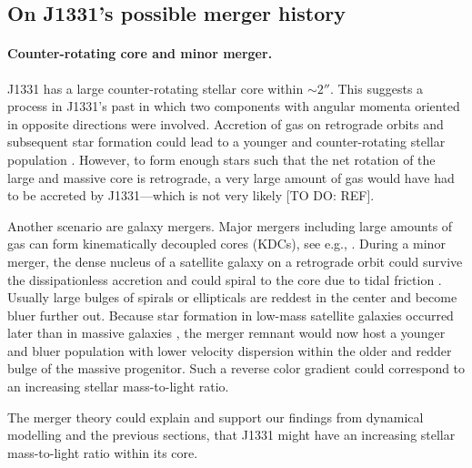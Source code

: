 \subsection{On J1331's possible merger history}


\paragraph{Counter-rotating core and minor merger.} J1331 has a large counter-rotating stellar core within $\sim 2''$. This suggests a process in J1331's past in which two components with angular momenta oriented in opposite directions were involved. Accretion of gas on retrograde orbits and subsequent star formation could lead to a younger and counter-rotating stellar population \Wilma{[TO DO: REF]}. However, to form enough stars such that the net rotation of the large and massive core is retrograde, a very large amount of gas would have had to be accreted by J1331---which is not very likely [TO DO: REF]. 

Another scenario are galaxy mergers. Major mergers including large amounts of gas can form kinematically decoupled cores (KDCs), see e.g., . During a minor merger, the dense nucleus of a satellite galaxy on a retrograde orbit could survive the dissipationless accretion and could spiral to the core due to tidal friction \citep{1984ApJ...287..577K}. Usually large bulges of spirals or ellipticals are reddest in the center and become bluer further out.  Because star formation in low-mass satellite galaxies occurred later than in massive galaxies \Wilma{[TO DO: REF]}, the merger remnant would now host a younger and bluer population with lower velocity dispersion within the older and redder bulge of the massive progenitor. Such a reverse color gradient could correspond to an increasing stellar mass-to-light ratio.

The merger theory could explain and support our findings from dynamical modelling and the previous sections, that J1331 might have an increasing stellar mass-to-light ratio within its core. 


